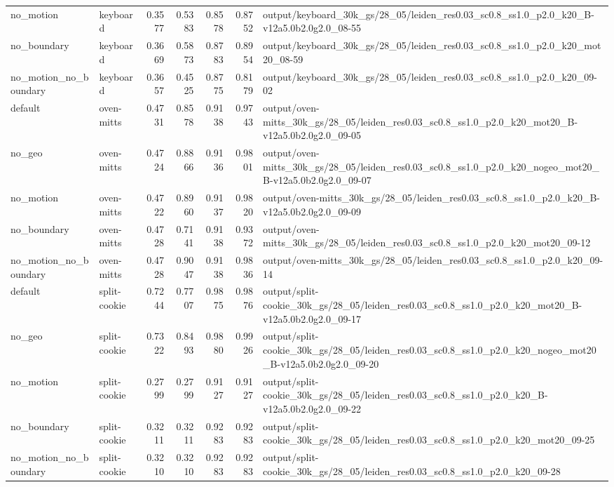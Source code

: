 \documentclass[10pt]{article}
\begin{document}
\begin{longtable}{llrrrrp{9cm}}
no\_motion & keyboard & 0.3577 & 0.5383 & 0.8578 & 0.8752 & output/keyboard\_30k\_gs/28\_05/leiden\_res0.03\_sc0.8\_ss1.0\_p2.0\_k20\_B-v12a5.0b2.0g2.0\_08-55 \\
no\_boundary & keyboard & 0.3669 & 0.5873 & 0.8783 & 0.8954 & output/keyboard\_30k\_gs/28\_05/leiden\_res0.03\_sc0.8\_ss1.0\_p2.0\_k20\_mot20\_08-59 \\
no\_motion\_no\_boundary & keyboard & 0.3657 & 0.4525 & 0.8775 & 0.8179 & output/keyboard\_30k\_gs/28\_05/leiden\_res0.03\_sc0.8\_ss1.0\_p2.0\_k20\_09-02 \\
default & oven-mitts & 0.4731 & 0.8578 & 0.9138 & 0.9743 & output/oven-mitts\_30k\_gs/28\_05/leiden\_res0.03\_sc0.8\_ss1.0\_p2.0\_k20\_mot20\_B-v12a5.0b2.0g2.0\_09-05 \\
no\_geo & oven-mitts & 0.4724 & 0.8866 & 0.9136 & 0.9801 & output/oven-mitts\_30k\_gs/28\_05/leiden\_res0.03\_sc0.8\_ss1.0\_p2.0\_k20\_nogeo\_mot20\_B-v12a5.0b2.0g2.0\_09-07 \\
no\_motion & oven-mitts & 0.4722 & 0.8960 & 0.9137 & 0.9820 & output/oven-mitts\_30k\_gs/28\_05/leiden\_res0.03\_sc0.8\_ss1.0\_p2.0\_k20\_B-v12a5.0b2.0g2.0\_09-09 \\
no\_boundary & oven-mitts & 0.4728 & 0.7141 & 0.9138 & 0.9372 & output/oven-mitts\_30k\_gs/28\_05/leiden\_res0.03\_sc0.8\_ss1.0\_p2.0\_k20\_mot20\_09-12 \\
no\_motion\_no\_boundary & oven-mitts & 0.4728 & 0.9047 & 0.9138 & 0.9836 & output/oven-mitts\_30k\_gs/28\_05/leiden\_res0.03\_sc0.8\_ss1.0\_p2.0\_k20\_09-14 \\
default & split-cookie & 0.7244 & 0.7707 & 0.9875 & 0.9876 & output/split-cookie\_30k\_gs/28\_05/leiden\_res0.03\_sc0.8\_ss1.0\_p2.0\_k20\_mot20\_B-v12a5.0b2.0g2.0\_09-17 \\
no\_geo & split-cookie & 0.7322 & 0.8493 & 0.9880 & 0.9926 & output/split-cookie\_30k\_gs/28\_05/leiden\_res0.03\_sc0.8\_ss1.0\_p2.0\_k20\_nogeo\_mot20\_B-v12a5.0b2.0g2.0\_09-20 \\
no\_motion & split-cookie & 0.2799 & 0.2799 & 0.9127 & 0.9127 & output/split-cookie\_30k\_gs/28\_05/leiden\_res0.03\_sc0.8\_ss1.0\_p2.0\_k20\_B-v12a5.0b2.0g2.0\_09-22 \\
no\_boundary & split-cookie & 0.3211 & 0.3211 & 0.9283 & 0.9283 & output/split-cookie\_30k\_gs/28\_05/leiden\_res0.03\_sc0.8\_ss1.0\_p2.0\_k20\_mot20\_09-25 \\
no\_motion\_no\_boundary & split-cookie & 0.3210 & 0.3210 & 0.9283 & 0.9283 & output/split-cookie\_30k\_gs/28\_05/leiden\_res0.03\_sc0.8\_ss1.0\_p2.0\_k20\_09-28 \\
\bottomrule
\end{longtable}
\normalsize
\end{document}

